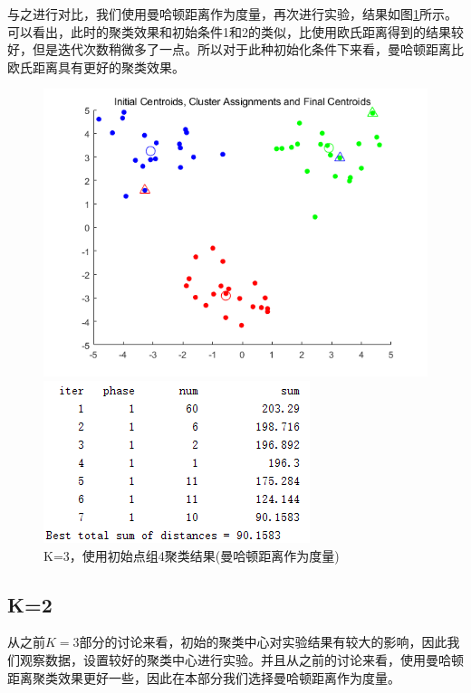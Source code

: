 \documentclass[cn]{elegantbook}
\begin{document}
与之进行对比，我们使用曼哈顿距离作为度量，再次进行实验，结果如图\ref{res341}所示。可以看出，此时的聚类效果和初始条件1和2的类似，比使用欧氏距离得到的结果较好，但是迭代次数稍微多了一点。所以对于此种初始化条件下来看，曼哈顿距离比欧氏距离具有更好的聚类效果。
\begin{figure}[!h]
	\centering
	\begin{minipage}{0.48\linewidth}
		\centering
		\includegraphics[width=\linewidth]{images/res342}
	\end{minipage}
	\begin{minipage}{0.48\linewidth}
		\centering
		\includegraphics[width=\linewidth]{images/res343}
	\end{minipage}
	\caption{\label{res341}K=3，使用初始点组4聚类结果(曼哈顿距离作为度量)}
\end{figure}

\subsection{K=2}
从之前$K=3$部分的讨论来看，初始的聚类中心对实验结果有较大的影响，因此我们观察数据，设置较好的聚类中心进行实验。并且从之前的讨论来看，使用曼哈顿距离聚类效果更好一些，因此在本部分我们选择曼哈顿距离作为度量。%
\end{document}

